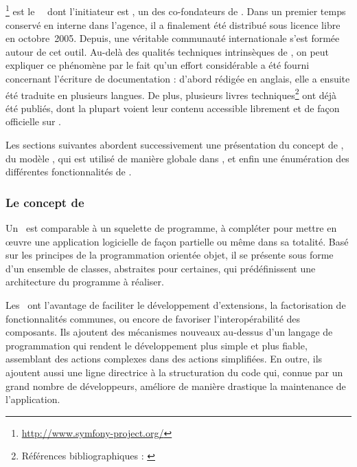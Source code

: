 \subsection{\asf}
\label{section:outils_sf}

\asf\footnote{\url{http://www.symfony-project.org/}} est le \afm\ \aphp\ dont l'initiateur est \apotencier, un des co-fondateurs de \asl. Dans un premier temps conservé en interne dans l'agence, il a finalement été distribué sous licence libre en octobre~2005. Depuis, une véritable communauté internationale s'est formée autour de cet outil. Au-delà des qualités techniques intrinsèques de \asf, on peut expliquer ce phénomène par le fait qu'un effort considérable a été fourni concernant l'écriture de documentation : d'abord rédigée en anglais, elle a ensuite été traduite en plusieurs langues. De plus, plusieurs livres techniques\footnote{Références bibliographiques : \cite{practicalsf} \cite{sfrefguide} \cite{cahierssf} \cite{moresf} \cite{thebook}} ont déjà été publiés, dont la plupart voient leur contenu accessible librement et de façon officielle sur \ainternet.

Les sections suivantes abordent successivement une présentation du con\-cept de \afm, du modèle \amvc, qui est utilisé de manière globale dans \asf, et enfin une énumération des différentes fonctionnalités de \asf.


\subsubsection{Le concept de \afm}

Un \afm\ est comparable à un squelette de programme, à compléter pour mettre en œuvre une application logicielle de façon partielle ou même dans sa totalité. Basé sur les principes de la programmation orientée objet, il se présente sous forme d'un ensemble de classes, abstraites pour certaines, qui prédéfinissent une architecture du programme à réaliser.

Les \afms\ ont l'avantage de faciliter le développement d'extensions, la factorisation de fonctionnalités communes, ou encore de favoriser l'interopérabilité des composants. Ils ajoutent des mécanismes nouveaux au-dessus d'un langage de programmation qui rendent le développement plus simple et plus fiable, assemblant des actions complexes dans des actions simplifiées. En outre, ils ajoutent aussi une ligne directrice à la structuration du code qui, connue par un grand nombre de développeurs, améliore de manière drastique la maintenance de l'application.

